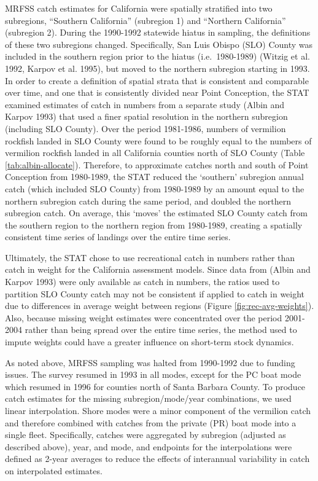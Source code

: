 \documentclass[11pt,
  english,
  a4paper,
]{article}
\begin{document}
MRFSS catch estimates for California were spatially stratified into two subregions, ``Southern California'' (subregion 1) and ``Northern California'' (subregion 2). During the 1990-1992 statewide hiatus in sampling, the definitions of these two subregions changed. Specifically, San Luis Obispo (SLO) County was included in the southern region prior to the hiatus (i.e.~1980-1989) {(Witzig et al. 1992, Karpov et al. 1995)\leavevmode\tagmcend\tagstructend}, but moved to the northern subregion starting in 1993. In order to create a definition of spatial strata that is consistent and comparable over time, and one that is consistently divided near Point Conception, the STAT examined estimates of catch in numbers from a separate study {(Albin and Karpov 1993)\leavevmode\tagmcend\tagstructend} that used a finer spatial resolution in the northern subregion (including SLO County). Over the period 1981-1986, numbers of vermilion rockfish landed in SLO County were found to be roughly equal to the numbers of vermilion rockfish landed in all California counties north of SLO County (Table \ref{tab:albin-allocate}). Therefore, to approximate catches north and south of Point Conception from 1980-1989, the STAT reduced the `southern' subregion annual catch (which included SLO County) from 1980-1989 by an amount equal to the northern subregion catch during the same period, and doubled the northern subregion catch. On average, this `moves' the estimated SLO County catch from the southern region to the northern region from 1980-1989, creating a spatially consistent time series of landings over the entire time series.

Ultimately, the STAT chose to use recreational catch in numbers rather than catch in weight for the California assessment models. Since data from {(Albin and Karpov 1993)\leavevmode\tagmcend\tagstructend} were only available as catch in numbers, the ratios used to partition SLO County catch may not be consistent if applied to catch in weight due to differences in average weight between regions (Figure \ref{fig:rec-avg-weights}). Also, because missing weight estimates were concentrated over the period 2001-2004 rather than being spread over the entire time series, the method used to impute weights could have a greater influence on short-term stock dynamics.

As noted above, MRFSS sampling was halted from 1990-1992 due to funding issues. The survey resumed in 1993 in all modes, except for the PC boat mode which resumed in 1996 for counties north of Santa Barbara County. To produce catch estimates for the missing subregion/mode/year combinations, we used linear interpolation. Shore modes were a minor component of the vermilion catch and therefore combined with catches from the private (PR) boat mode into a single fleet. Specifically, catches were aggregated by subregion (adjusted as described above), year, and mode, and endpoints for the interpolations were defined as 2-year averages to reduce the effects of interannual variability in catch on interpolated estimates.
\end{document}
